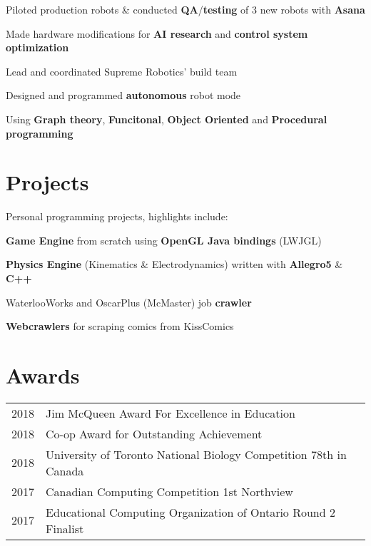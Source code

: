 \documentclass[]{chandan-cv}
\begin{document}
\begin{minipage}[t]{0.66\textwidth}
\begin{tightemize}
	\item Piloted production robots \& conducted \textbf{QA}/\textbf{testing} of 3 new robots with \textbf{Asana}
	\item Made hardware modifications for \textbf{AI research} and \textbf{control system optimization}
\end{tightemize}
\sectionsep

\begin{tightemize}
	\item Lead and coordinated Supreme Robotics' build team
	\item Designed and programmed \textbf{autonomous} robot mode
	\item Using \textbf{Graph theory}, \textbf{Funcitonal}, \textbf{Object Oriented} and \textbf{Procedural programming}
\end{tightemize}
\sectionsep


\section{Projects}
\descript{ }
\location{ } %
Personal programming projects, highlights include:
\begin{tightemize}
	\item \textbf{Game Engine} from scratch using \textbf{OpenGL Java bindings} (LWJGL)
	\item \textbf{Physics Engine} (Kinematics \& Electrodynamics) written with \textbf{Allegro5} \& \textbf{C++}
	\item WaterlooWorks and OscarPlus (McMaster) job \textbf{crawler}
	\item \textbf{Webcrawlers} for scraping comics from KissComics
\end{tightemize}
\sectionsep


\section{Awards}
\begin{tabular}{rll}
2018		&	Jim McQueen Award For Excellence in Education\\
2018		&	Co-op Award for Outstanding Achievement\\
2018		& University of Toronto National Biology Competition 78th in Canada\\
2017		&	Canadian Computing Competition 1st Northview\\
2017		&	Educational Computing Organization of Ontario Round 2 Finalist\\
\end{tabular}
\sectionsep


\end{minipage}
\end{document}
